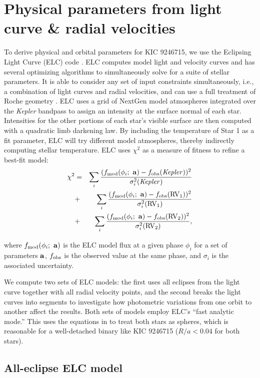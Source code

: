 \section{Physical parameters from light curve \& radial velocities}\label{model}
To derive physical and orbital parameters for KIC 9246715, we use the Eclipsing Light Curve (ELC) code \citep{oro00}. ELC computes model light and velocity curves and has several optimizing algorithms to simultaneously solve for a suite of stellar parameters. It is able to consider any set of input constraints simultaneously, i.e., a combination of light curves and radial velocities, and can use a full treatment of Roche geometry \citep{kop69,avn75}. ELC uses a grid of NextGen model atmospheres integrated over the \emph{Kepler} bandpass to assign an intensity at the surface normal of each star. Intensities for the other portions of each star's visible surface are then computed with a quadratic limb darkening law. By including the temperature of Star 1 as a fit parameter, ELC will try different model atmospheres, thereby indirectly computing stellar temperature. ELC uses $\chi^2$ as a measure of fitness to refine a best-fit model:
\begin{eqnarray}
\chi^2 & = &
\sum_i \frac{ (f_{\rm{mod}}(\phi_i; \ {\bf a}) - f_{\rm{obs}}(\rm{\it{Kepler}}))^2 }{\sigma_i^2(\rm{\it{Kepler}})} \nonumber \\
& + & \sum_i \frac{ (f_{\rm{mod}}(\phi_i; \ {\bf a}) - f_{\rm{obs}}(\rm{RV_1}))^2 }{\sigma_i^2(\rm{RV_1})} \\
& + & \sum_i \frac{(f_{\rm{mod}}(\phi_i; \ {\bf a}) - f_{\rm{obs}}(\rm{RV_2}))^2}{\sigma_i^2(\rm{RV_2})}, \nonumber
\end{eqnarray}

where $f_{\rm{mod}}(\phi_i; \ {\bf a})$ is the ELC model flux at a given phase $\phi_i$ for a set of parameters ${\bf a}$, $f_{\rm{obs}}$ is the observed value at the same phase, and $\sigma_i$ is the associated uncertainty.

We compute two sets of ELC models: the first uses all eclipses from the light curve together with all radial velocity points, and the second breaks the light curves into segments to investigate how photometric variations from one orbit to another affect the results. Both sets of models employ ELC's ``fast analytic mode.'' This uses the equations in \citet{man02} to treat both stars as spheres, which is reasonable for a well-detached binary like KIC 9246715 ($R/a < 0.04$ for both stars).

\subsection{All-eclipse ELC model}

